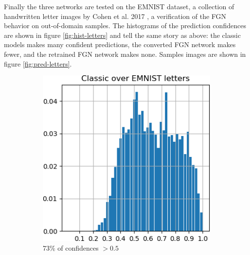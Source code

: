 \documentclass[12pt,oneside]{CUNY_PhD}
\begin{document}
Finally the three networks are tested on the EMNIST dataset, a collection of handwritten letter images by Cohen et al. 2017 \cite{cohen2017emnist}, a verification of the FGN behavior on out-of-domain samples. The histograms of the prediction confidences are shown in figure \ref{fig:hist-letters} and tell the same story as above: the classic models makes many confident predictions, the converted FGN network makes fewer, and the retrained FGN network makes none. Samples images are shown in figure \ref{fig:pred-letters}.
\begin{figure}[!h]
    \centering
    \begin{subfigure}[t]{0.32\textwidth}
        \includegraphics[width=\textwidth]{images/Letters/hist-classic-letters.png}
        \caption*{73\%  of confidences $>0.5$}
    \end{subfigure}
    \begin{subfigure}[t]{0.32\textwidth}

\end{subfigure}
\end{figure}
\end{document}
